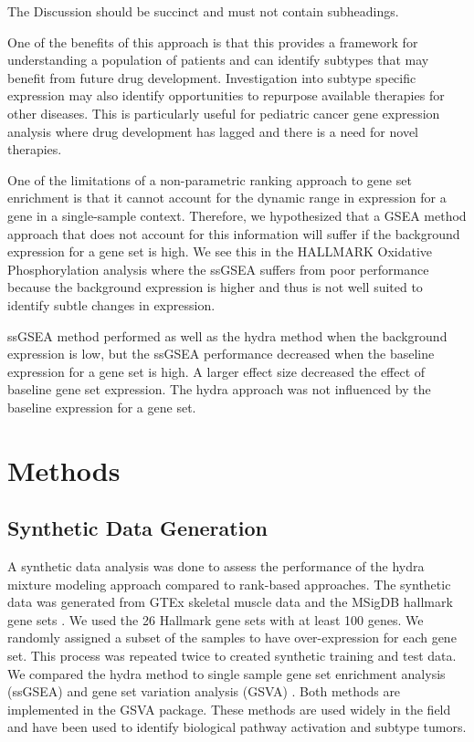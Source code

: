 \documentclass[fleqn,10pt]{wlscirep}
\begin{document}
The Discussion should be succinct and must not contain subheadings.

One of the benefits of this approach is that this provides a framework for understanding a population of patients and can identify subtypes that may benefit from future drug development. Investigation into subtype specific expression may also identify opportunities to repurpose available therapies for other diseases. This is particularly useful for pediatric cancer gene expression analysis where drug development has lagged and there is a need for novel therapies. 

One of the limitations of a non-parametric ranking approach to gene set enrichment is that it cannot account for the dynamic range in expression for a gene in a single-sample context. Therefore, we hypothesized that a GSEA method approach that does not account for this information will suffer if the background expression for a gene set is high. We see this in the HALLMARK Oxidative Phosphorylation analysis where the ssGSEA suffers from poor performance because the background expression is higher and thus is not well suited to identify subtle changes in expression.

ssGSEA method performed as well as the hydra method when the background expression is low, but the ssGSEA performance decreased when the baseline expression for a gene set is high. A larger effect size decreased the effect of baseline gene set expression. The hydra approach was not influenced by the baseline expression for a gene set.


\section*{Methods}


\subsection{Synthetic Data Generation}
A synthetic data analysis was done to assess the performance of the hydra mixture modeling approach compared to rank-based approaches. The synthetic data was generated from GTEx skeletal muscle data and the MSigDB hallmark gene sets \cite{consortium2013genotype,liberzon2011molecular}. We used the 26 Hallmark gene sets with at least 100 genes. We randomly assigned a subset of the samples to have over-expression for each gene set. This process was repeated twice to created synthetic training and test data. We compared the hydra method to single sample gene set enrichment analysis (ssGSEA) \cite{barbie2009systematic} and gene set variation analysis (GSVA) \cite{hanzelmann2013gsva}. Both methods are implemented in the GSVA package. These methods are used widely in the field and have been used to identify biological pathway activation and subtype tumors.
\end{document}
